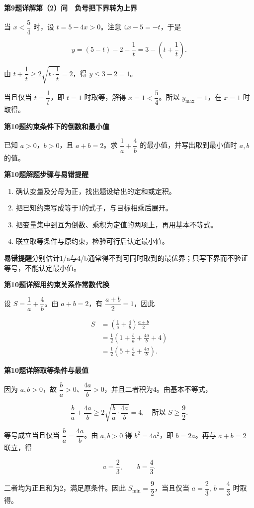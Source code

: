 \documentclass[UTF8,10pt,aspectratio=169]{ctexbeamer}
\newcommand{\PageHeading}[1]{\begin{center}{\Large\bfseries #1}\end{center}\vspace{0.12cm}}
\begin{document}
\begin{frame}[t]
\PageHeading{第9题详解\quad 第（2）问　负号把下界转为上界}
当 $x<\dfrac54$ 时，设 $t=5-4x>0$。注意 $4x-5=-t$，于是
\par
\pause
\[y=(5-t)-2-\frac1t=3-\left(t+\frac1t\right).\]
\par
由 $t+\dfrac1t\ge2\sqrt{t\cdot\dfrac1t}=2$，得 $y\le3-2=1$。
\par
当且仅当 $t=\dfrac1t$，即 $t=1$ 时取等，解得 $x=1<\dfrac54$。所以 $\boxed{y_{\max}=1}$，在 $\boxed{x=1}$ 时取得。
\par
\end{frame}
\begin{frame}[t]
\PageHeading{第10题\quad 约束条件下的倒数和最小值}
已知 $a>0$，$b>0$，且 $a+b=2$。求 $\dfrac1a+\dfrac4b$ 的最小值，并写出取到最小值时 $a,b$ 的值。
\par
\end{frame}
\begin{frame}[t]
\PageHeading{第10题\quad 解题步骤与易错提醒}
\begin{enumerate}\item 确认变量及分母为正，找出题设给出的定和或定积。
\item 把已知约束写成等于1的式子，与目标相乘后展开。
\item 把变量集中到互为倒数、乘积为定值的两项上，再用基本不等式。
\item 联立取等条件与原约束，检验可行后认定最小值。\end{enumerate}
\par
\pause
\vspace{0.18cm}\textbf{易错提醒}\quad 分别估计1/a与4/b通常得不到可同时取到的最优界；只写下界而不验证等号，不能认定最小值。
\par
\end{frame}
\begin{frame}[t]
\PageHeading{第10题详解\quad 用约束关系作常数代换}
设 $S=\dfrac1a+\dfrac4b$。由 $a+b=2$，有 $\dfrac{a+b}{2}=1$，因此
\par
\pause
\[\begin{aligned}S&=\left(\frac1a+\frac4b\right)\frac{a+b}{2}\\ &=\frac12\left(1+\frac ba+\frac{4a}b+4\right)\\ &=\frac12\left(5+\frac ba+\frac{4a}b\right).\end{aligned}\]
\par
\end{frame}
\begin{frame}[t]
\PageHeading{第10题详解\quad 取等条件与最值}
因为 $a,b>0$，故 $\dfrac ba>0$、$\dfrac{4a}b>0$，并且二者积为4。由基本不等式，
\par
\pause
\[\frac ba+\frac{4a}b\ge2\sqrt{\frac ba\cdot\frac{4a}b}=4,\quad\text{所以 }S\ge\frac92.\]
\par
等号成立当且仅当 $\dfrac ba=\dfrac{4a}b$。由 $a,b>0$ 得 $b^2=4a^2$，即 $b=2a$。再与 $a+b=2$ 联立，得
\par
\[a=\frac23,\qquad b=\frac43.\]
\par
二者均为正且和为2，满足原条件。因此 $\boxed{S_{\min}=\dfrac92}$，当且仅当 $\boxed{a=\dfrac23,\ b=\dfrac43}$ 时取得。
\par
\end{frame}
\end{document}
